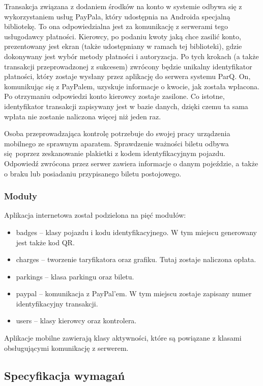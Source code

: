 Transakcja związana z dodaniem środków na konto w systemie odbywa się z wykorzystaniem usług PayPala, który udostępnia na Androida specjalną bibliotekę. To ona odpowiedzialna jest za komunikację z serwerami tego usługodawcy płatności. Kierowcy, po podaniu kwoty jaką chce zasilić konto, prezentowany jest ekran (także udostępniany w ramach tej biblioteki), gdzie dokonywany jest wybór metody płatności i autoryzacja. Po tych krokach (a także transakcji przeprowadzonej z sukcesem) zwrócony będzie unikalny identyfikator płatności, który zostaje wysłany przez aplikację do serwera systemu ParQ. On, komunikując się z PayPalem, uzyskuje informacje o kwocie, jak została wpłacona. Po otrzymaniu odpowiedzi konto kierowcy zostaje zasilone. Co istotne, identyfikator transakcji zapisywany jest w bazie danych, dzięki czemu ta sama wpłata nie zostanie naliczona więcej niż jeden raz.

Osoba przeprowadzająca kontrolę potrzebuje do swojej pracy urządzenia mobilnego ze sprawnym aparatem. Sprawdzenie ważności biletu odbywa się poprzez zeskanowanie plakietki z kodem identyfikacyjnym pojazdu. Odpowiedź zwrócona przez serwer zawiera informacje o danym pojeździe, a także o braku lub posiadaniu przypisanego biletu postojowego. 

\subsubsection*{Moduły}

Aplikacja internetowa został podzielona na pięć modułów:

\begin{itemize}
	\item badges -- klasy pojazdu i kodu identyfikacyjnego. W tym miejscu generowany jest także kod QR. 
	\item charges -- tworzenie taryfikatora oraz grafiku. Tutaj zostaje naliczona opłata.
	\item parkings -- klasa parkingu oraz biletu.
	\item paypal -- komunikacja z PayPal'em. W tym miejscu zostaje zapisany numer identyfikacyjny transakcji.
	\item users -- klasy kierowcy oraz kontrolera.
\end{itemize}

Aplikacje mobilne zawierają klasy aktywności, które są powiązane z klasami obsługującymi komunikację z serwerem.

\subsection{Specyfikacja wymagań}

